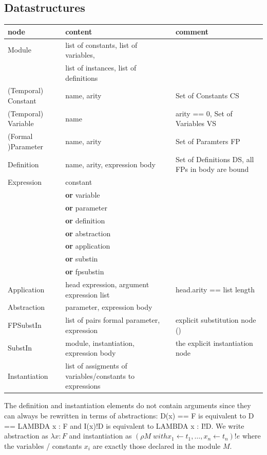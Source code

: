 \documentclass[a4paper]{article}
\newcommand{\dor}{\textbf{or}}
\begin{document}
\subsection{Datastructures}
\label{sec:ds}

\begin{tabular}{lp{}p{}}
node & content & comment \\
\hline
Module & list of constants, list of variables, & \\
       & list of instances, list of definitions & \\
(Temporal) Constant  & name, arity & Set of Constants CS \\
(Temporal) Variable  & name & arity == 0, Set of Variables VS \\
(Formal )Parameter & name, arity & Set of Paramters FP \\
Definition & name, arity, expression body & Set of Definitions DS,
                                            all FPs in body are bound \\
Expression  & constant & \\
          & \dor{} variable & \\
          & \dor{} parameter & \\
          & \dor{} definition & \\
          & \dor{} abstraction &\\
          & \dor{} application &\\
          & \dor{} substin & \\
          & \dor{} fpsubstin & \\
Application & head expression, argument expression list & head.arity == list length\\
Abstraction & parameter, expression body & \\
FPSubstIn  & list of pairs formal parameter, expression & explicit substitution node () \\
SubstIn     & module, instantiation, expression body & the explicit instantiation node \\
Instantiation & list of assigments of variables/constants to expressions& \\
\end{tabular}

The definition and instantiation elements do not contain arguments since they
 can always be rewritten in terms of abstractions: D(x) == F is equivalent to
 D == LAMBDA x : F and I(x)!D is equivalent to LAMBDA x : I!D. We write
 abstraction as $\lambda x : F$ and instantiation as $(\rho M\; with x_1
 \leftarrow t_1,\ldots,x_n \leftarrow t_n)!e$ where the variables / constants
 $x_i$ are exactly those declared in the module $M$.
\end{document}
